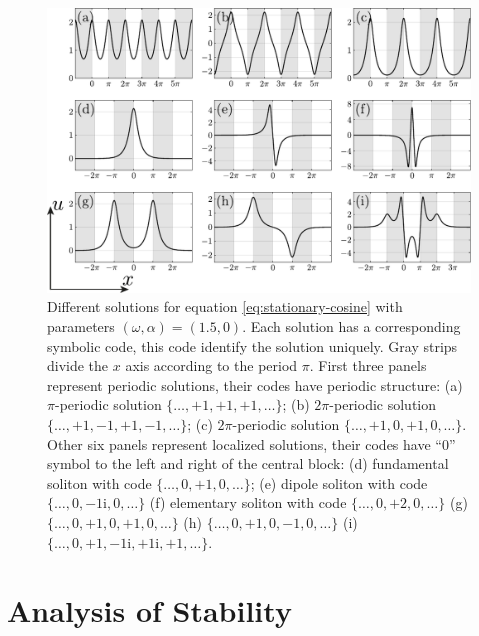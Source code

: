\begin{figure}[h]
\centering
	\includegraphics[scale = 1]{pic/solutions for cosine equation}
	\caption{
		Different solutions for equation \eqref{eq:stationary-cosine} with parameters $(\omega, \alpha) = (1.5, 0)$.
		Each solution has a corresponding symbolic code, this code identify the solution uniquely.
		Gray strips divide the $x$ axis according to the period $\pi$.
		First three panels represent periodic solutions, their codes have periodic structure: (a) $\pi$-periodic solution $\{ \dots, +1, +1, +1, \dots \}$; (b) $2 \pi$-periodic solution $\{ \dots, +1, -1, +1, -1, \dots \}$; (c) $2 \pi$-periodic solution $\{ \dots, +1, 0, +1, 0, \dots \}$.
		Other six panels represent localized solutions, their codes have ``$0$'' symbol to the left and right of the central block: (d) fundamental soliton with code $\{ \dots, 0, +1, 0, \dots \}$; (e) dipole soliton with code $\{ \dots, 0, -1\mathrm{i}, 0, \dots \}$ (f) elementary soliton with code $\{ \dots, 0, +2, 0, \dots \}$ (g) $\{ \dots, 0, +1, 0, +1, 0, \dots \}$ (h) $\{ \dots, 0, +1, 0, -1, 0, \dots \}$ (i) $\{ \dots, 0, +1, -1\mathrm{i}, +1\mathrm{i}, +1, \dots \}$.
	}
\label{fig:solutions-cosine}
\end{figure}

\section{Analysis of Stability}

